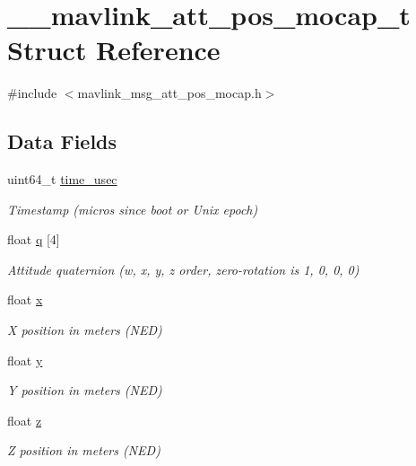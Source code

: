 \hypertarget{struct____mavlink__att__pos__mocap__t}{\section{\+\_\+\+\_\+mavlink\+\_\+att\+\_\+pos\+\_\+mocap\+\_\+t Struct Reference}
\label{struct____mavlink__att__pos__mocap__t}
}


{\ttfamily \#include $<$mavlink\+\_\+msg\+\_\+att\+\_\+pos\+\_\+mocap.\+h$>$}

\subsection*{Data Fields}
\begin{DoxyCompactItemize}
\item 
uint64\+\_\+t \hyperlink{struct____mavlink__att__pos__mocap__t_a0cd64db5a68694d4a7335cf20e4a7246}{time\+\_\+usec}
\begin{DoxyCompactList}\small\item\em Timestamp (micros since boot or Unix epoch) \end{DoxyCompactList}\item 
float \hyperlink{struct____mavlink__att__pos__mocap__t_a5982f9253ea45bf83430ba79deeb4c45}{q} \mbox{[}4\mbox{]}
\begin{DoxyCompactList}\small\item\em Attitude quaternion (w, x, y, z order, zero-\/rotation is 1, 0, 0, 0) \end{DoxyCompactList}\item 
float \hyperlink{struct____mavlink__att__pos__mocap__t_a027bbd8bd036dc4f93f3d04473cec7a3}{x}
\begin{DoxyCompactList}\small\item\em X position in meters (N\+E\+D) \end{DoxyCompactList}\item 
float \hyperlink{struct____mavlink__att__pos__mocap__t_aa39c9c0dee9ce44ce4ad63ce29e5e23b}{y}
\begin{DoxyCompactList}\small\item\em Y position in meters (N\+E\+D) \end{DoxyCompactList}\item 
float \hyperlink{struct____mavlink__att__pos__mocap__t_aa7e434319052c1a368ef6ab6175aa3bd}{z}
\begin{DoxyCompactList}\small\item\em Z position in meters (N\+E\+D) \end{DoxyCompactList}\end{DoxyCompactItemize}


